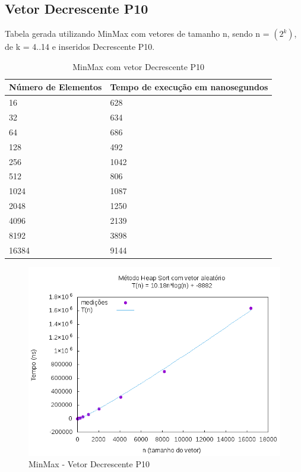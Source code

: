 \documentclass[12pt,a4paper,twoside]{report}
\begin{document}
\subsection{Vetor Decrescente P10}
Tabela gerada utilizando MinMax com vetores de tamanho n, sendo n = $(2^k)$, de k = 4..14 e inseridos Decrescente P10.
\begin{table}[H]
\centering
\caption{MinMax com vetor Decrescente P10}
\label{my-label}
\begin{tabular}{|l|l|}
\hline
\multicolumn{1}{|c|}{\textbf{Número de Elementos}} & \multicolumn{1}{c|}{\textbf{Tempo de execução em nanosegundos}} \\ \hline
16 & 628 \\ \hline
32 & 634 \\ \hline
64 & 686 \\ \hline
128 & 492 \\ \hline
256 & 1042 \\ \hline
512 & 806 \\ \hline
1024 & 1087 \\ \hline
2048 & 1250 \\ \hline
4096 & 2139 \\ \hline
8192 & 3898 \\ \hline
16384 & 9144 \\ \hline
\end{tabular}
\end{table}

\begin{figure}[H]
    \centering
    \includegraphics[width=0.7\linewidth]{graficos/HeapSort/vIntAleatorio/vIntAleatorio.png}
  \caption{MinMax - Vetor Decrescente P10}
\end{figure}
\end{document}
